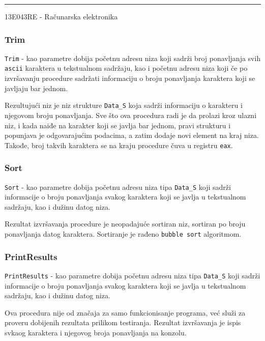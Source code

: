 \documentclass[a4paper, 12pt]{article}
\newcommand{\btmline}{
\vfill
\rule{0.9\textwidth}{0.4mm}
\begin{center}
13E043RE - Računarska elektronika
\end{center}}
\begin{document}
\btmline\newpage

\subsubsection*{\textsf{Trim}}

\verb|Trim| - kao parametre dobija početnu adresu niza koji sadrži broj ponavljanja svih \verb|ascii| karaktera u tekstualnom sadržaju, kao i početnu adresu niza koji če po izvršavanju procedure sadržati informaciju o broju ponavljanja karaktera koji se javljaju bar jednom.

Rezultujući niz je niz strukture \verb|Data_S| koja sadrži informaciju o karakteru i njegovom broju ponavljanja. Sve što ova procedura radi je da prolazi kroz ulazni niz, i kada naiđe na karakter koji se javlja bar jednom, pravi strukturu i popunjava je odgovarajućim podacima, a zatim dodaje novi element na kraj niza. Takođe, broj takvih karaktera se na kraju procedure čuva u registru \verb|eax|.

\subsubsection*{\textsf{Sort}}

\verb|Sort| - kao parametre dobija početnu adresu niza tipa \verb|Data_S| koji sadrži informacije o broju ponavljanja svakog karaktera koji se javlja u tekstualnom sadržaju, kao i dužinu datog niza.

Rezultat izvršavanja procedure je neopadajuće sortiran niz, sortiran po broju ponavljanja datog karaktera. Sortiranje je rađeno \verb|bubble sort| algoritmom.

\subsubsection*{\textsf{PrintResults}}

\verb|PrintResults| - kao parametre dobija početnu adresu niza tipa \verb|Data_S| koji sadrži informacije o broju ponavljanja svakog karaktera koji se javlja u tekstualnom sadržaju, kao i dužinu datog niza.
  
Ova procedura nije od značaja za samo funkcionisanje programa, već služi za proveru dobijenih rezultata prilikom testiranja. Rezultat izvršavanja je ispis svkaog karaktera i njegovog broja ponavljanja na konzolu.
\end{document}
